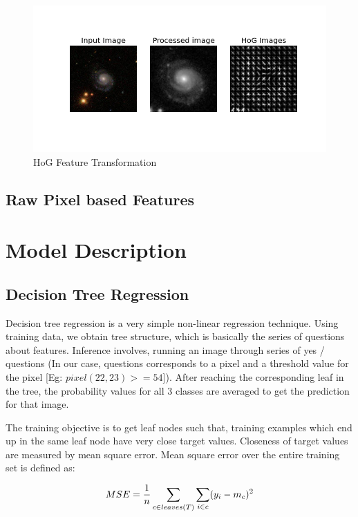 \documentclass[10pt]{article}
\begin{document}
\begin{center}
\begin{figure}[h]
\includegraphics[scale=0.8]{images/HoG_features_noisy.png}
\caption{HoG Feature Transformation}
\label{fig:hog}
\end{figure}
\end{center}


\subsection*{Raw Pixel based Features}

\section*{Model Description}

\subsection*{Decision Tree Regression}
Decision tree regression is a very simple non-linear regression technique. Using training data, we obtain tree structure, which is basically the series of questions about features. Inference involves, running an image through series of yes / questions (In our case, questions corresponds to a pixel and a threshold value for the pixel [Eg: $pixel(22, 23) >= 54$]). After reaching the corresponding leaf in the tree, the probability values for all 3 classes are averaged to get the prediction for that image.   

The training objective is to get leaf nodes such that, training examples which end up in the same leaf node have very close target values. Closeness of target values are measured by mean square error. Mean square error over the entire training set is defined as:

$$MSE = {1 \over n}  \sum_{c \in leaves(T)} \sum_{i \in c} (y_i - m_c)^2$$
\end{document}
